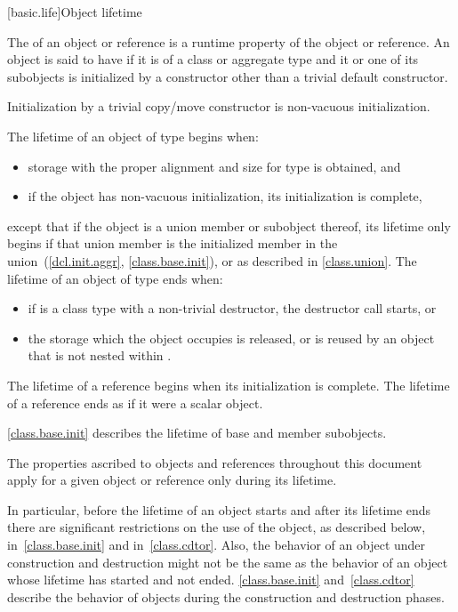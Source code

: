 [basic.life]{Object lifetime}

\pnum
{}%
The  of an object or reference is a runtime property of the
object or reference.
An object is said to have  if it is of a class or
aggregate type and it or one of its subobjects is initialized by a constructor
other than a trivial default constructor. \begin{note} Initialization by a
trivial copy/move constructor is non-vacuous initialization. \end{note}
The lifetime of an object of type  begins when:
\begin{itemize}
\item storage with the proper alignment and size for type  is
obtained, and
\item if the object has non-vacuous initialization, its initialization is complete,
\end{itemize}
except that if the object is a union member or subobject thereof,
its lifetime only begins if that union member is the
initialized member in the union~(\ref{dcl.init.aggr}, \ref{class.base.init}),
or as described in \ref{class.union}.
The lifetime of an object  of type  ends when:
\begin{itemize}
\item if  is a class type with a non-trivial
destructor, the destructor call starts, or
\item the storage which the object occupies is released,
or is reused by an object that is not nested within .
\end{itemize}

\pnum
The lifetime of a reference begins when its initialization is complete.
The lifetime of a reference ends as if it were a scalar object.

\pnum
\begin{note} \ref{class.base.init}
describes the lifetime of base and member subobjects. \end{note}

\pnum
The properties ascribed to objects and references throughout this document
apply for a given object or reference only during its lifetime. \begin{note}
In particular, before the lifetime of an object starts and after its
lifetime ends there are significant restrictions on the use of the
object, as described below, in~\ref{class.base.init} and
in~\ref{class.cdtor}. Also, the behavior of an object under construction
and destruction might not be the same as the behavior of an object whose
lifetime has started and not ended. \ref{class.base.init}
and~\ref{class.cdtor} describe the behavior of objects during the
construction and destruction phases. \end{note}

